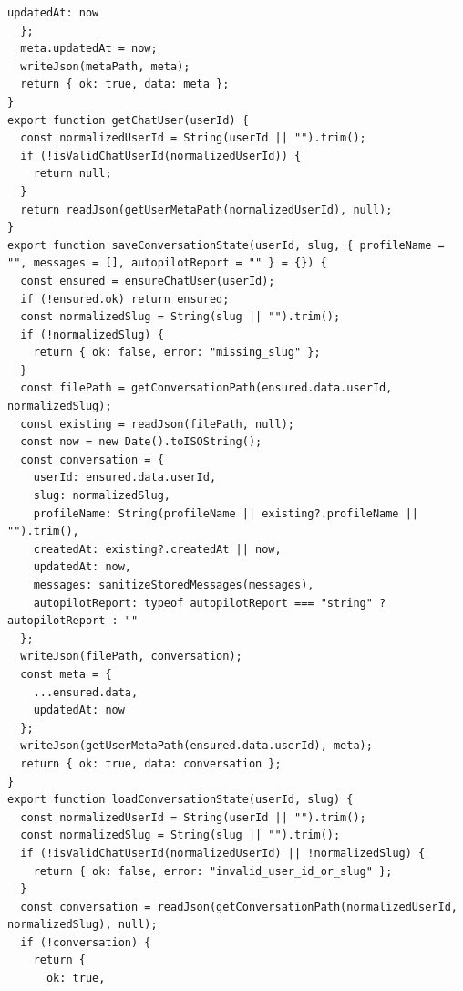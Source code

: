 \documentclass[12pt,a4paper]{article}
\begin{document}
\begin{Verbatim}[fontsize=\footnotesize]
    updatedAt: now
  };
  meta.updatedAt = now;
  writeJson(metaPath, meta);
  return { ok: true, data: meta };
}
export function getChatUser(userId) {
  const normalizedUserId = String(userId || "").trim();
  if (!isValidChatUserId(normalizedUserId)) {
    return null;
  }
  return readJson(getUserMetaPath(normalizedUserId), null);
}
export function saveConversationState(userId, slug, { profileName = "", messages = [], autopilotReport = "" } = {}) {
  const ensured = ensureChatUser(userId);
  if (!ensured.ok) return ensured;
  const normalizedSlug = String(slug || "").trim();
  if (!normalizedSlug) {
    return { ok: false, error: "missing_slug" };
  }
  const filePath = getConversationPath(ensured.data.userId, normalizedSlug);
  const existing = readJson(filePath, null);
  const now = new Date().toISOString();
  const conversation = {
    userId: ensured.data.userId,
    slug: normalizedSlug,
    profileName: String(profileName || existing?.profileName || "").trim(),
    createdAt: existing?.createdAt || now,
    updatedAt: now,
    messages: sanitizeStoredMessages(messages),
    autopilotReport: typeof autopilotReport === "string" ? autopilotReport : ""
  };
  writeJson(filePath, conversation);
  const meta = {
    ...ensured.data,
    updatedAt: now
  };
  writeJson(getUserMetaPath(ensured.data.userId), meta);
  return { ok: true, data: conversation };
}
export function loadConversationState(userId, slug) {
  const normalizedUserId = String(userId || "").trim();
  const normalizedSlug = String(slug || "").trim();
  if (!isValidChatUserId(normalizedUserId) || !normalizedSlug) {
    return { ok: false, error: "invalid_user_id_or_slug" };
  }
  const conversation = readJson(getConversationPath(normalizedUserId, normalizedSlug), null);
  if (!conversation) {
    return {
      ok: true,
\end{Verbatim}
\newpage
{}
\fancyhead[R]{}
\end{document}
